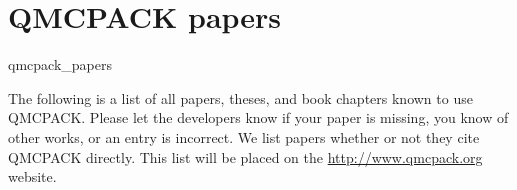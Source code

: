 \chapter{QMCPACK papers}
\begin{btSect}{qmcpack_papers}

  The following is a list of all papers, theses, and book chapters
  known to use QMCPACK. Please let the developers know if your paper
  is missing, you know of other works, or an entry is incorrect. We
  list papers whether or not they cite QMCPACK directly. This list
  will be placed on the \url{http://www.qmcpack.org} website.

\btPrintAll

\end{btSect}
